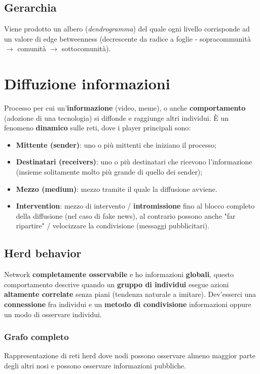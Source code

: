 \documentclass{article}
\begin{document}
  \subsection{Gerarchia}
    Viene prodotto un albero (\textit{dendrogramma}) del quale ogni livello corrisponde ad un valore di edge betweenness (decrescente da radice a foglie - sopracommunità $\rightarrow$ comunità $\rightarrow$ sottocomunità).
\section{Diffuzione informazioni}
  Processo per cui un'\textbf{informazione} (video, meme), o anche \textbf{comportamento} (adozione di una tecnologia) si diffonde e raggiunge altri individui. È un fenomeno \textbf{dinamico} sulle reti, dove i player principali sono:
  \begin{itemize}
      \item \textbf{Mittente (sender)}: uno o più mittenti che iniziano il processo;
      \item \textbf{Destinatari (receivers)}: uno o più destinatari che ricevono l'informazione (insieme solitamente molto più grande di quello dei sender);
      \item \textbf{Mezzo (medium)}: mezzo tramite il quale la diffusione avviene.
      \item \textbf{Intervention}: mezzo di intervento / \textbf{intromissione} fino al blocco completo della diffusione (nel caso di fake news), al contrario possono anche "far ripartire" / velocizzare la condivisione (messaggi pubblicitari).
  \end{itemize}
  \subsection{Herd behavior}
    Network \textbf{completamente osservabile} e ho informazioni \textbf{globali}, questo comportamento descrive quando un \textbf{gruppo di individui} esegue azioni \textbf{altamente correlate} senza piani (tendenza naturale a imitare). Dev'esserci una \textbf{connessione} fra individui e un \textbf{metodo di condivisione} informazioni oppure un modo di osservare individui.
    \subsubsection{Grafo completo}
      Rappresentazione di reti herd dove nodi possono osservare almeno maggior parte degli altri nosi e possono osservare informazioni pubbliche.
\end{document}

